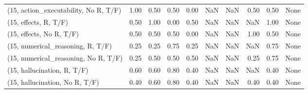 \begin{table*}[h!]
\begin{adjustbox}{width=2\columnwidth,center}
\begin{tabular}{lrrr|rrr|rrr}
(15, action\_executability, No R, T/F) &                      1.00 &                  0.50 &                      0.50 &                          0.00 &                       NaN &                           NaN &                                   0.50 &                               0.50 &                                  None \\
(15, effects, R, T/F)                 &                      0.50 &                  1.00 &                      0.00 &                          0.50 &                       NaN &                           NaN &                                    NaN &                               1.00 &                                  None \\
(15, effects, No R, T/F)              &                      0.50 &                  0.50 &                      0.50 &                          0.00 &                       NaN &                           NaN &                                   1.00 &                               0.50 &                                  None \\
(15, numerical\_reasoning, R, T/F)     &                      0.25 &                  0.25 &                      0.75 &                          0.25 &                       NaN &                           NaN &                                    NaN &                               0.75 &                                  None \\
(15, numerical\_reasoning, No R, T/F)  &                      0.25 &                  0.50 &                      0.50 &                          0.50 &                       NaN &                           NaN &                                   0.25 &                               0.75 &                                  None \\
(15, hallucination, R, T/F)           &                      0.60 &                  0.60 &                      0.80 &                          0.40 &                       NaN &                           NaN &                                    NaN &                               0.40 &                                  None \\
(15, hallucination, No R, T/F)        &                      0.40 &                  0.60 &                      0.80 &                          0.40 &                       NaN &                           NaN &                                   0.40 &                               0.40 &                                  None \\

\end{tabular}
\end{adjustbox}
\end{table*}

